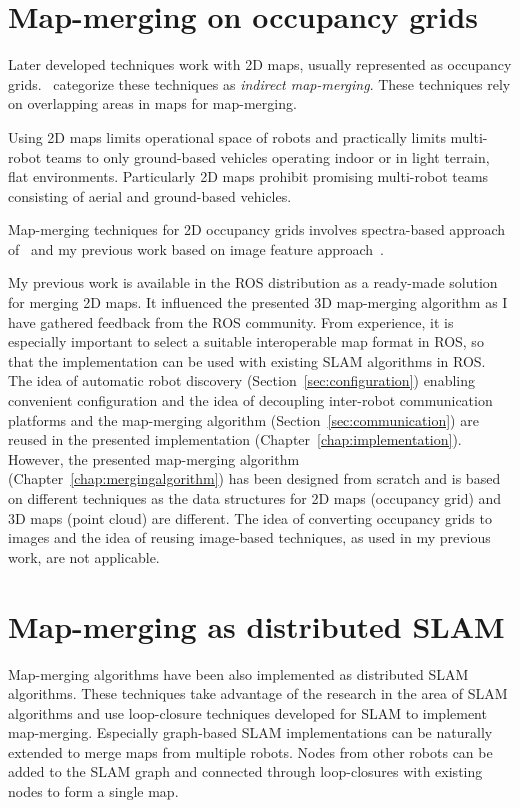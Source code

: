 \section{Map-merging on occupancy grids}

Later developed techniques work with \gls{2D} maps, usually represented as occupancy grids. \citet{lee2012survey}~categorize these techniques as \textit{indirect map-merging}. These techniques rely on overlapping areas in maps for map-merging.

Using \gls{2D} maps limits operational space of robots and practically limits multi-robot teams to only ground-based vehicles operating indoor or in light terrain, flat environments. Particularly \gls{2D} maps prohibit promising multi-robot teams consisting of aerial and ground-based vehicles.

Map-merging techniques for \gls{2D} occupancy grids involves spectra-based approach of~\citet{carpin2008spectra} and my previous work based on image feature approach~\citep{Horner2016}.

My previous work is available in the \gls{ROS} distribution as a ready-made solution for merging \gls{2D} maps. It influenced the presented \gls{3D} map-merging algorithm as I have gathered feedback from the \gls{ROS} community. From experience, it is especially important to select a suitable interoperable map format in \gls{ROS}, so that the implementation can be used with existing \gls{SLAM} algorithms in \gls{ROS}. The idea of automatic robot discovery (Section~\ref{sec:configuration}) enabling convenient configuration and the idea of decoupling inter-robot communication platforms and the map-merging algorithm (Section~\ref{sec:communication}) are reused in the presented implementation (Chapter~\ref{chap:implementation}). However, the presented map-merging algorithm (Chapter~\ref{chap:mergingalgorithm}) has been designed from scratch and is based on different techniques as the data structures for \gls{2D} maps (occupancy grid) and \gls{3D} maps (point cloud) are different. The idea of converting occupancy grids to images and the idea of reusing image-based techniques, as used in my previous work, are not applicable.

\section{Map-merging as distributed SLAM}

Map-merging algorithms have been also implemented as distributed \gls{SLAM} algorithms. These techniques take advantage of the research in the area of \gls{SLAM} algorithms and use loop-closure techniques developed for \gls{SLAM} to implement map-merging. Especially graph-based \gls{SLAM} implementations can be naturally extended to merge maps from multiple robots. Nodes from other robots can be added to the \gls{SLAM} graph and connected through loop-closures with existing nodes to form a single map.

